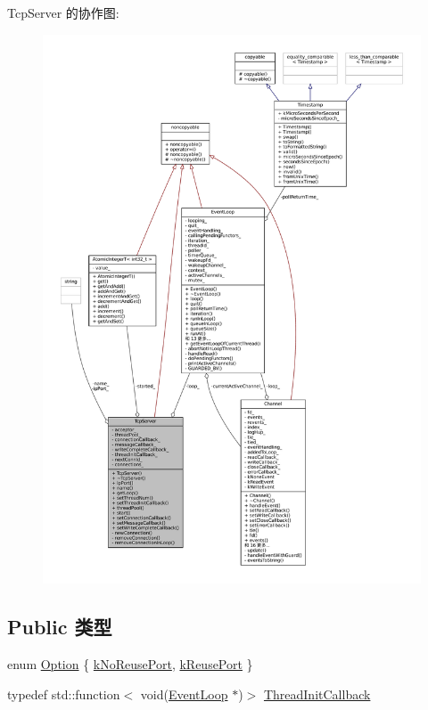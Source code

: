 Tcp\+Server 的协作图\+:
\nopagebreak
\begin{figure}[H]
\begin{center}
\leavevmode
\includegraphics[width=350pt]{classmuduo_1_1net_1_1TcpServer__coll__graph}
\end{center}
\end{figure}
\subsection*{Public 类型}
\begin{DoxyCompactItemize}
\item 
enum \hyperlink{classmuduo_1_1net_1_1TcpServer_a0e65ad13124ea2cb5e255b640464e35f}{Option} \{ \hyperlink{classmuduo_1_1net_1_1TcpServer_a0e65ad13124ea2cb5e255b640464e35fa5ddf56db99b3883a1c729e8b6873bbf5}{k\+No\+Reuse\+Port}, 
\hyperlink{classmuduo_1_1net_1_1TcpServer_a0e65ad13124ea2cb5e255b640464e35faff0a9f131923034f6981deb08a5d6691}{k\+Reuse\+Port}
 \}
\item 
typedef std\+::function$<$ void(\hyperlink{classmuduo_1_1net_1_1EventLoop}{Event\+Loop} $\ast$)$>$ \hyperlink{classmuduo_1_1net_1_1TcpServer_a4665880f4633f1e7d95fd6fef6811717}{Thread\+Init\+Callback}
\end{DoxyCompactItemize}
